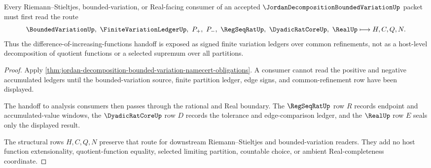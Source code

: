 \begin{theorem}
\label{thm:jordan-decomposition-bounded-variation-consumer-route}
Every Riemann--Stieltjes, bounded-variation, or Real-facing consumer of an accepted $\JordanDecompositionBoundedVariationUp$ packet must first read the route
$$
\BoundedVariationUp,\ \FiniteVariationLedgerUp,\ P_{+},\ P_{-},\ \RegSeqRatUp,\ \DyadicRatCoreUp,\ \RealUp \longmapsto H,C,Q,N .
$$
Thus the difference-of-increasing-functions handoff is exposed as signed finite variation ledgers over common refinements, not as a host-level decomposition of quotient functions or a selected supremum over all partitions.
\end{theorem}
\begin{proof}
Apply \autoref{thm:jordan-decomposition-bounded-variation-namecert-obligations}. A consumer cannot read the positive and negative accumulated ledgers until the bounded-variation source, finite partition ledger, edge signs, and common-refinement row have been displayed.

The handoff to analysis consumers then passes through the rational and Real boundary. The $\RegSeqRatUp$ row $R$ records endpoint and accumulated-value windows, the $\DyadicRatCoreUp$ row $D$ records the tolerance and edge-comparison ledger, and the $\RealUp$ row $E$ seals only the displayed result.

The structural rows $H,C,Q,N$ preserve that route for downstream Riemann--Stieltjes and bounded-variation readers. They add no host function extensionality, quotient-function equality, selected limiting partition, countable choice, or ambient Real-completeness coordinate.
\end{proof}

